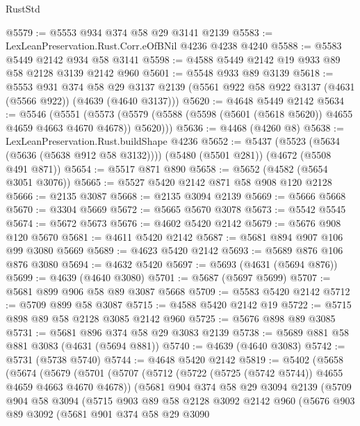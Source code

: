 \begin{lexlean}{RustStd}
\begin{coremodule}
@5579 := @5553 @934 @374 @58 @29 @3141 @2139
@5583 := LexLeanPreservation.Rust.Corr.eOfBNil @4236 @4238 @4240
@5588 := @5583 @5449 @2142 @934 @58 @3141
@5598 := @4588 @5449 @2142 @19 @933 @89 @58 @2128 @3139 @2142 @960
@5601 := @5548 @933 @89 @3139
@5618 := @5553
    @931
    @374
    @58
    @29
    @3137
    @2139
    (@5561 @922 @58 @922 @3137 (@4631 (@5566 @922)) (@4639 (@4640 @3137)))
@5620 := @4648 @5449 @2142
@5634 := @5546
    (@5551
      (@5573 (@5579 (@5588 (@5598 (@5601 (@5618 @5620)) @4655 @4659 @4663 @4670 @4678)) @5620)))
@5636 := @4468 (@4260 @8)
@5638 := LexLeanPreservation.Rust.buildShape @4236
@5652 := @5437
    (@5523 (@5634 (@5636 (@5638 @912 @58 @3132))))
    (@5480 (@5501 @281))
    (@4672 (@5508 @491 @871))
@5654 := @5517 @871 @890
@5658 := @5652 (@4582 (@5654 @3051 @3076))
@5665 := @5527 @5420 @2142 @871 @58 @908 @120 @2128
@5666 := @2135 @3087
@5668 := @2135 @3094 @2139
@5669 := @5666 @5668
@5670 := @3304 @5669
@5672 := @5665 @5670 @3078
@5673 := @5542 @5545
@5674 := @5672 @5673
@5676 := @4602 @5420 @2142
@5679 := @5676 @908 @120 @5670
@5681 := @4611 @5420 @2142
@5687 := @5681 @894 @907 @106 @99 @3080 @5669
@5689 := @4623 @5420 @2142
@5693 := @5689 @876 @106 @876 @3080
@5694 := @4632 @5420
@5697 := @5693 (@4631 (@5694 @876))
@5699 := @4639 (@4640 @3080)
@5701 := @5687 (@5697 @5699)
@5707 := @5681 @899 @906 @58 @89 @3087 @5668
@5709 := @5583 @5420 @2142
@5712 := @5709 @899 @58 @3087
@5715 := @4588 @5420 @2142 @19
@5722 := @5715 @898 @89 @58 @2128 @3085 @2142 @960
@5725 := @5676 @898 @89 @3085
@5731 := @5681 @896 @374 @58 @29 @3083 @2139
@5738 := @5689 @881 @58 @881 @3083 (@4631 (@5694 @881))
@5740 := @4639 (@4640 @3083)
@5742 := @5731 (@5738 @5740)
@5744 := @4648 @5420 @2142
@5819 := @5402
    (@5658
      (@5674
        (@5679
          (@5701
            (@5707
              (@5712 (@5722 (@5725 (@5742 @5744)) @4655 @4659 @4663 @4670 @4678))
              (@5681
                @904
                @374
                @58
                @29
                @3094
                @2139
                (@5709
                  @904
                  @58
                  @3094
                  (@5715
                    @903
                    @89
                    @58
                    @2128
                    @3092
                    @2142
                    @960
                    (@5676
                      @903
                      @89
                      @3092
                      (@5681
                        @901
                        @374
                        @58
                        @29
                        @3090

\end{coremodule}
\end{lexlean}
